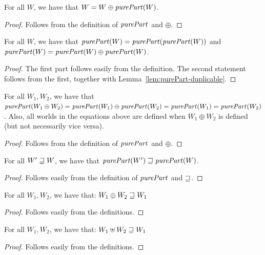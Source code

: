 \documentclass[a4paper]{article}
\begin{document}
\begin{lemma}
  \label{lem:purePart-duplicable}
 For all $W$, we have that $W = W \oplus \purePart{W}$.
\end{lemma}
\begin{proof}
  Follows from the definition of $\purePart{}$ and $\oplus$.
\end{proof}

\begin{lemma}
  \label{lem:purePart-idempotent}
  For all $W$, we have that $\purePart{W} = \purePart{}(\purePart{W})$ and $\purePart{W} = \purePart{W} \oplus \purePart{W}$.
\end{lemma}
\begin{proof}
  The first part follows easily from the definition.
  The second statement follows from the first, together with Lemma~\ref{lem:purePart-duplicable}.
\end{proof}

\begin{lemma}
  \label{lem:purePart-oplus}
  For all $W_1,W_2$, we have that $\purePart{W_1\oplus W_2} = \purePart{W_1} \oplus \purePart{W_2} = \purePart{W_1} = \purePart{W_2}$.
  Also, all worlds in the equations above are defined when $W_1\oplus W_2$ is defined (but not necessarily vice versa).
\end{lemma}
\begin{proof}
  Follows from the definition of $\purePart{}$ and $\oplus$.
\end{proof}

\begin{lemma}
  \label{lem:purePart-mono}
 For all $W'\sqsupseteq W$, we have that $\purePart{W'} \future \purePart{W}$.
\end{lemma}
\begin{proof}
  Follows easily from the definition of $\purePart{}$ and $\sqsupseteq$.
\end{proof}

\begin{lemma}
  \label{lem:oplus-future}
  For all $W_1,W_2$, we have that:
  $W_1 \oplus W_2 \sqsupseteq W_1$
\end{lemma}
\begin{proof}
  Follows easily from the definitions.
\end{proof}

\begin{lemma}
  \label{lem:uplus-future}
  For all $W_1,W_2$, we have that:
  $W_1 \uplus W_2 \sqsupseteq W_1$
\end{lemma}
\begin{proof}
  Follows easily from the definitions.
\end{proof}
\end{document}
